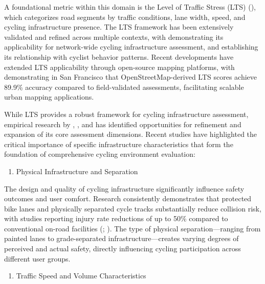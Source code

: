 \documentclass[
  12pt,
  oneside]{book}
\providecommand{\tightlist}{%
  \setlength{\itemsep}{0pt}\setlength{\parskip}{0pt}}
\begin{document}
A foundational metric within this domain is the Level of Traffic Stress (LTS) (\textcite{mekuria_low-stress_2012}), which categorizes road segments by traffic conditions, lane width, speed, and cycling infrastructure presence. The LTS framework has been extensively validated and refined across multiple contexts, with \textcite{furth_network_2016} demonstrating its applicability for network-wide cycling infrastructure assessment, and \textcite{dill_revisiting_2016} establishing its relationship with cyclist behavior patterns. Recent developments have extended LTS applicability through open-source mapping platforms, with \textcite{wasserman_evaluating_2019} demonstrating in San Francisco that OpenStreetMap-derived LTS scores achieve 89.9\% accuracy compared to field-validated assessments, facilitating scalable urban mapping applications.

While LTS provides a robust framework for cycling infrastructure assessment, empirical research by \textcite{lowry_assessment_2012}, \textcite{buehler_bikeway_2016}, and \textcite{wang_does_2016} has identified opportunities for refinement and expansion of its core assessment dimensions. Recent studies have highlighted the critical importance of specific infrastructure characteristics that form the foundation of comprehensive cycling environment evaluation:

\begin{enumerate}
\def\labelenumi{\arabic{enumi}.}
\tightlist
\item
  Physical Infrastructure and Separation
\end{enumerate}

The design and quality of cycling infrastructure significantly influence safety outcomes and user comfort. Research consistently demonstrates that protected bike lanes and physically separated cycle tracks substantially reduce collision risk, with studies reporting injury rate reductions of up to 50\% compared to conventional on-road facilities (\textcite{harris_comparing_2013}; \textcite{reynolds_impact_2009}). The type of physical separation---ranging from painted lanes to grade-separated infrastructure---creates varying degrees of perceived and actual safety, directly influencing cycling participation across different user groups.

\begin{enumerate}
\def\labelenumi{\arabic{enumi}.}
\setcounter{enumi}{1}
\tightlist
\item
  Traffic Speed and Volume Characteristics
\end{enumerate}
\end{document}
